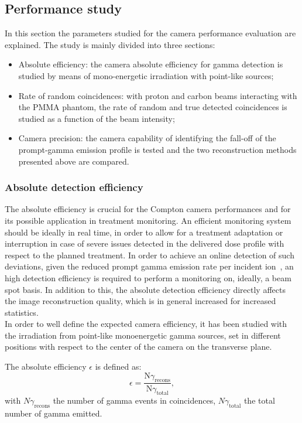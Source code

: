 \subsection{Performance study}
\label{MatMeth:performance}
In this section the parameters studied for the camera performance evaluation are explained. The study is mainly divided into three sections:
\begin{itemize}

\item Absolute efficiency: the camera absolute efficiency for gamma detection is studied by means of mono-energetic irradiation with point-like sources;
\item Rate of random coincidences: with proton and carbon beams interacting with the PMMA phantom, the rate of random and true detected coincidences is studied as a function of the beam intensity;
\item Camera precision: the camera capability of identifying the fall-off of the prompt-gamma emission profile is tested and the two reconstruction methods presented above are compared. 

\end{itemize}


\subsubsection{Absolute detection efficiency}
The absolute efficiency is crucial for the Compton camera performances and for its possible application in treatment monitoring. An efficient monitoring system should be ideally in real time, in order to allow for a treatment adaptation or interruption in case of severe issues detected in the delivered dose profile with respect to the planned treatment. In order to achieve an online detection of such deviations, given the reduced prompt gamma emission rate per incident ion~\cite{Ortega:2015aa}, an high detection efficiency is required to perform a monitoring on, ideally, a beam spot basis. In addition to this, the absolute detection efficiency directly affects the image reconstruction quality, which is in general increased for increased statistics.\\

In order to well define the expected camera efficiency, it has been studied with the irradiation from point-like monoenergetic gamma sources, set in different positions with respect to the center of the camera on the transverse plane.	

The absolute efficiency $\epsilon$ is defined as:
\begin{equation}
\epsilon =\frac{\mathrm{N}\gamma_{\mathrm{recons}}}{\mathrm{N}\gamma_{\mathrm{total}}},
\end{equation}
\label{eq:equation_efficacite_absolue}
with $N\gamma_{\mathrm{recons}}$ the number of gamma events in coincidences, $N\gamma_{\mathrm{total}}$ the total number of gamma emitted.\newline

